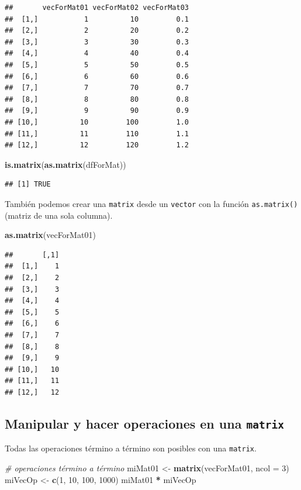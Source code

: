 \documentclass[]{book}
\newenvironment{Shaded}{\begin{snugshade}}{\end{snugshade}}
\newcommand{\KeywordTok}[1]{\textcolor[rgb]{0.13,0.29,0.53}{\textbf{#1}}}
\newcommand{\DataTypeTok}[1]{\textcolor[rgb]{0.13,0.29,0.53}{#1}}
\newcommand{\DecValTok}[1]{\textcolor[rgb]{0.00,0.00,0.81}{#1}}
\newcommand{\StringTok}[1]{\textcolor[rgb]{0.31,0.60,0.02}{#1}}
\newcommand{\CommentTok}[1]{\textcolor[rgb]{0.56,0.35,0.01}{\textit{#1}}}
\newcommand{\OperatorTok}[1]{\textcolor[rgb]{0.81,0.36,0.00}{\textbf{#1}}}
\newcommand{\NormalTok}[1]{#1}
\begin{document}
\begin{verbatim}
##       vecForMat01 vecForMat02 vecForMat03
##  [1,]           1          10         0.1
##  [2,]           2          20         0.2
##  [3,]           3          30         0.3
##  [4,]           4          40         0.4
##  [5,]           5          50         0.5
##  [6,]           6          60         0.6
##  [7,]           7          70         0.7
##  [8,]           8          80         0.8
##  [9,]           9          90         0.9
## [10,]          10         100         1.0
## [11,]          11         110         1.1
## [12,]          12         120         1.2
\end{verbatim}

\begin{Shaded}
\begin{Highlighting}[]
\KeywordTok{is.matrix}\NormalTok{(}\KeywordTok{as.matrix}\NormalTok{(dfForMat))}
\end{Highlighting}
\end{Shaded}

\begin{verbatim}
## [1] TRUE
\end{verbatim}

También podemos crear una \texttt{matrix} desde un \texttt{vector} con
la función \texttt{as.matrix()} (matriz de una sola columna).

\begin{Shaded}
\begin{Highlighting}[]
\KeywordTok{as.matrix}\NormalTok{(vecForMat01)}
\end{Highlighting}
\end{Shaded}

\begin{verbatim}
##       [,1]
##  [1,]    1
##  [2,]    2
##  [3,]    3
##  [4,]    4
##  [5,]    5
##  [6,]    6
##  [7,]    7
##  [8,]    8
##  [9,]    9
## [10,]   10
## [11,]   11
## [12,]   12
\end{verbatim}

\subsection{\texorpdfstring{Manipular y hacer operaciones en una
\texttt{matrix}}{Manipular y hacer operaciones en una matrix}}\label{manipular-y-hacer-operaciones-en-una-matrix}

Todas las operaciones término a término son posibles con una
\texttt{matrix}.

\begin{Shaded}
\begin{Highlighting}[]
\CommentTok{# operaciones término a término}
\NormalTok{miMat01 <-}\StringTok{ }\KeywordTok{matrix}\NormalTok{(vecForMat01, }\DataTypeTok{ncol =} \DecValTok{3}\NormalTok{)}
\NormalTok{miVecOp <-}\StringTok{ }\KeywordTok{c}\NormalTok{(}\DecValTok{1}\NormalTok{, }\DecValTok{10}\NormalTok{, }\DecValTok{100}\NormalTok{, }\DecValTok{1000}\NormalTok{)}
\NormalTok{miMat01 }\OperatorTok{*}\StringTok{ }\NormalTok{miVecOp}
\end{Highlighting}
\end{Shaded}
\end{document}
